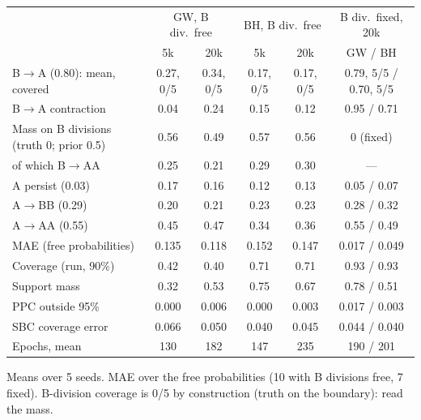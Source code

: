\documentclass[10pt,a4paper]{article}
\newcommand{\blk}[1]{\par\needspace{5\baselineskip}\smallskip{\sffamily\bfseries\color{inkgray}#1}\par}
\newcommand{\Comment}{\blk{Comment}}
\begin{document}
\begin{center}\footnotesize
\begin{tabular}{@{}lccccc@{}}\toprule
 & \multicolumn{2}{c}{GW, B div.\ free} & \multicolumn{2}{c}{BH, B div.\ free} & B div.\ fixed, 20k \\
 & 5k & 20k & 5k & 20k & GW / BH \\\midrule
B$\to$A (0.80): mean, covered & 0.27, 0/5 & 0.34, 0/5 & 0.17, 0/5 & 0.17, 0/5 & 0.79, 5/5 / 0.70, 5/5 \\
B$\to$A contraction & 0.04 & 0.24 & 0.15 & 0.12 & 0.95 / 0.71 \\
Mass on B divisions (truth 0; prior 0.5) & 0.56 & 0.49 & 0.57 & 0.56 & 0 (fixed) \\
\quad of which B$\to$AA & 0.25 & 0.21 & 0.29 & 0.30 & --- \\
A persist (0.03) & 0.17 & 0.16 & 0.12 & 0.13 & 0.05 / 0.07 \\
A$\to$BB (0.29) & 0.20 & 0.21 & 0.23 & 0.23 & 0.28 / 0.32 \\
A$\to$AA (0.55) & 0.45 & 0.47 & 0.34 & 0.36 & 0.55 / 0.49 \\
MAE (free probabilities) & 0.135 & 0.118 & 0.152 & 0.147 & 0.017 / 0.049 \\
Coverage (run, 90\%) & 0.42 & 0.40 & 0.71 & 0.71 & 0.93 / 0.93 \\
Support mass & 0.32 & 0.53 & 0.75 & 0.67 & 0.78 / 0.51 \\
PPC outside 95\% & 0.000 & 0.006 & 0.000 & 0.003 & 0.017 / 0.003 \\
SBC coverage error & 0.066 & 0.050 & 0.040 & 0.045 & 0.044 / 0.040 \\
Epochs, mean & 130 & 182 & 147 & 235 & 190 / 201 \\\bottomrule
\end{tabular}

Means over 5 seeds. MAE over the free probabilities (10 with B divisions free, 7 fixed). B-division coverage is 0/5 by construction (truth on the boundary): read the mass.
\end{center}
\Comment
\end{document}
